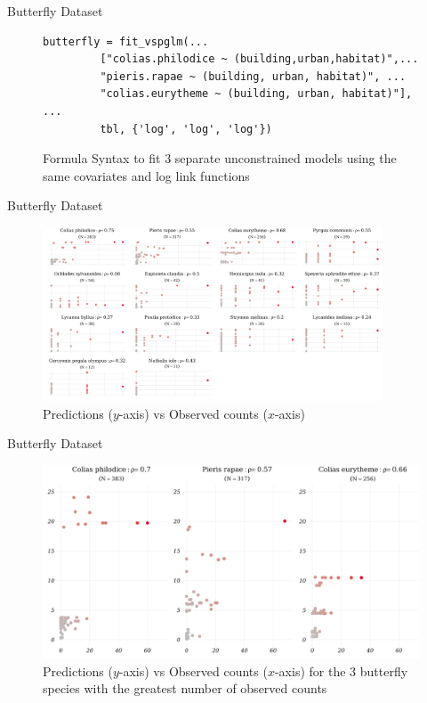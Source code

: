 \documentclass[9pt,notes=hide]{beamer}
\begin{document}
\begin{frame}[fragile]{Butterfly Dataset}
	\begin{figure}
		\centering
		\begin{verbatim}
butterfly = fit_vspglm(...
         ["colias.philodice ~ (building,urban,habitat)",...
         "pieris.rapae ~ (building, urban, habitat)", ...
         "colias.eurytheme ~ (building, urban, habitat)"], ...
         tbl, {'log', 'log', 'log'})
\end{verbatim}
		\caption{Formula Syntax to fit $3$ separate unconstrained models using the same covariates and log link functions}
	\end{figure}
\end{frame}

\begin{frame}{Butterfly Dataset}
	\begin{figure}
		\centering
		\includegraphics[width = 0.9\textwidth]{figures/butterfly_14d_poisson.png}
		\caption{Predictions ($y$-axis) vs Observed counts ($x$-axis) }
		\label{fig:butterfly_14d}
	\end{figure}
\end{frame}

\begin{frame}{Butterfly Dataset}
	\begin{figure}
		\centering
		\includegraphics[width = \textwidth]{figures/butterfly_3d_poisson.png}
		\caption{Predictions ($y$-axis) vs Observed counts ($x$-axis) for the $3$ butterfly species with the greatest number of observed counts}
		\label{fig:butterfly_3d}
	\end{figure}
\end{frame}
\end{document}
